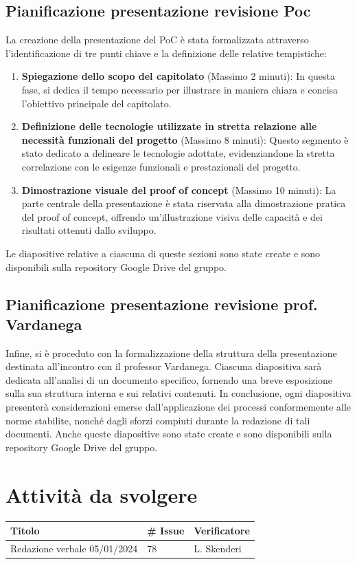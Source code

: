 \documentclass{article}
\begin{document}
\subsection{Pianificazione presentazione revisione Poc}
La creazione della presentazione del PoC è stata formalizzata attraverso l'identificazione di tre punti chiave e la definizione delle relative tempistiche:

\begin{enumerate}
    \item \textbf{Spiegazione dello scopo del capitolato} (Massimo 2 minuti): In questa fase, si dedica il tempo necessario per illustrare in maniera chiara e concisa l'obiettivo principale del capitolato.
    
    \item \textbf{Definizione delle tecnologie utilizzate in stretta relazione alle necessità funzionali del progetto} (Massimo 8 minuti): Questo segmento è stato dedicato a delineare le tecnologie adottate, evidenziandone la stretta correlazione con le esigenze funzionali e prestazionali del progetto.
    
    \item \textbf{Dimostrazione visuale del proof of concept} (Massimo 10 minuti): La parte centrale della presentazione è stata riservata alla dimostrazione pratica del proof of concept, offrendo un'illustrazione visiva delle capacità e dei risultati ottenuti dallo sviluppo.
\end{enumerate}

Le diapositive relative a ciascuna di queste sezioni sono state create e sono disponibili sulla repository Google Drive del gruppo.

\subsection{Pianificazione presentazione revisione prof. Vardanega}
Infine, si è proceduto con la formalizzazione della struttura della presentazione destinata all'incontro con il professor Vardanega. Ciascuna diapositiva sarà dedicata all'analisi di un documento specifico, fornendo una breve esposizione sulla sua struttura interna e sui relativi contenuti. In conclusione, ogni diapositiva presenterà considerazioni emerse dall'applicazione dei processi conformemente alle norme stabilite, nonché dagli sforzi compiuti durante la redazione di tali documenti.
Anche queste diapositive sono state create e sono disponibili sulla repository Google Drive del gruppo.


\section{Attività da svolgere}
    \begin{center}
        \begin{tabular}{|C{7cm}|C{1,5cm}|C{3cm}|}
            \hline
            \textbf{Titolo} & \textbf{\# Issue} & \textbf{Verificatore} \\
            \hline\hline
            Redazione verbale 05/01/2024 & 78 & L. Skenderi \\
            \hline
        \end{tabular}
    \end{center}
\end{document}
